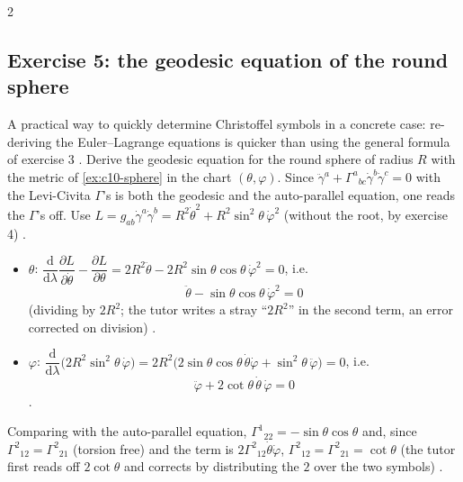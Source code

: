 \begin{paracol}{2}
\subsection*{Exercise 5: the geodesic equation of the round sphere}

A practical way to quickly determine Christoffel symbols in a concrete case: re-deriving the Euler--Lagrange equations is quicker than using the general formula of exercise 3 . Derive the geodesic equation for the round sphere of radius $R$ with the metric of \cref{ex:c10-sphere} in the chart $(\theta,\varphi)$. Since $\ddot\gamma^a+\Gamma^a{}_{bc}\dot\gamma^b\dot\gamma^c=0$ with the Levi-Civita $\Gamma$'s is both the geodesic and the auto-parallel equation, one reads the $\Gamma$'s off. Use $L=g_{ab}\dot\gamma^a\dot\gamma^b=R^2\dot\theta^2+R^2\sin^2\theta\,\dot\varphi^2$ (without the root, by exercise 4) .
\begin{itemize}
  \item $\theta$: $\dfrac{\mathrm d}{\mathrm d\lambda}\dfrac{\partial L}{\partial\dot\theta}-\dfrac{\partial L}{\partial\theta}=2R^2\ddot\theta-2R^2\sin\theta\cos\theta\,\dot\varphi^2=0$, i.e.
        \[\ddot\theta-\sin\theta\cos\theta\,\dot\varphi^2=0\]
        (dividing by $2R^2$; the tutor writes a stray ``$2R^2$'' in the second term, an error corrected on division) .
  \item $\varphi$: $\dfrac{\mathrm d}{\mathrm d\lambda}\bigl(2R^2\sin^2\theta\,\dot\varphi\bigr)=2R^2\bigl(2\sin\theta\cos\theta\,\dot\theta\dot\varphi+\sin^2\theta\,\ddot\varphi\bigr)=0$, i.e.
        \[\ddot\varphi+2\cot\theta\,\dot\theta\,\dot\varphi=0\]
        .
\end{itemize}
Comparing with the auto-parallel equation, $\Gamma^1{}_{22}=-\sin\theta\cos\theta$ and, since $\Gamma^2{}_{12}=\Gamma^2{}_{21}$ (torsion free) and the term is $2\Gamma^2{}_{12}\dot\theta\dot\varphi$, $\Gamma^2{}_{12}=\Gamma^2{}_{21}=\cot\theta$ (the tutor first reads off $2\cot\theta$ and corrects by distributing the $2$ over the two symbols) .


\end{paracol}

